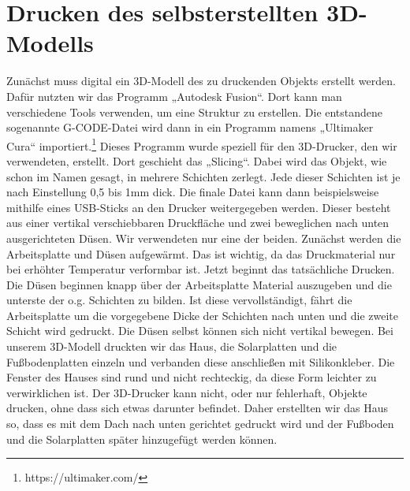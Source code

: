 \par
\par
\par
\par
\newpage

\section{Drucken des selbsterstellten 3D-Modells}
Zunächst muss digital ein 3D-Modell des zu druckenden Objekts erstellt werden. Dafür nutzten
wir das Programm „Autodesk Fusion“. Dort kann man verschiedene Tools verwenden, um eine
Struktur zu erstellen. Die entstandene sogenannte G-CODE-Datei wird dann in ein Programm
namens „Ultimaker Cura“ importiert.\footnote{https://ultimaker.com/} Dieses Programm wurde speziell für den 3D-Drucker, den wir
verwendeten, erstellt. Dort geschieht das „Slicing“. Dabei wird das Objekt, wie schon im Namen
gesagt, in mehrere Schichten zerlegt. Jede dieser Schichten ist je nach Einstellung 0,5 bis 1mm
dick. Die finale Datei kann dann beispielsweise mithilfe eines USB-Sticks an den Drucker
weitergegeben werden. Dieser besteht aus einer vertikal verschiebbaren Druckfläche und zwei
beweglichen nach unten ausgerichteten Düsen. Wir verwendeten nur eine der beiden. Zunächst
werden die Arbeitsplatte und Düsen aufgewärmt. Das ist wichtig, da das Druckmaterial nur bei
erhöhter Temperatur verformbar ist. Jetzt beginnt das tatsächliche Drucken. Die Düsen beginnen
knapp über der Arbeitsplatte Material auszugeben und die unterste der o.g. Schichten zu bilden.
Ist diese vervollständigt, fährt die Arbeitsplatte um die vorgegebene Dicke der Schichten nach
unten und die zweite Schicht wird gedruckt. Die Düsen selbst können sich nicht vertikal bewegen.
Bei unserem 3D-Modell druckten wir das Haus, die Solarplatten und die Fußbodenplatten einzeln
und verbanden diese anschließen mit Silikonkleber. Die Fenster des Hauses sind rund und nicht
rechteckig, da diese Form leichter zu verwirklichen ist. Der 3D-Drucker kann nicht, oder nur
fehlerhaft, Objekte drucken, ohne dass sich etwas darunter befindet. Daher erstellten wir das
Haus so, dass es mit dem Dach nach unten gerichtet gedruckt wird und der Fußboden und die
Solarplatten später hinzugefügt werden können.



